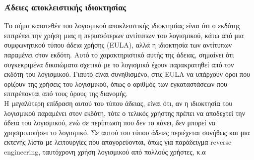 \subsubsection{Άδειες αποκλειστικής ιδιοκτησίας}
Το σήμα κατατεθέν του λογισμικού αποκλειστικής ιδιοκτησίας είναι ότι ο εκδότης επιτρέπει την χρήση μιας η περισσότερων αντίτυπων του λογισμικού, κάτω από μια συμφωνητικού τύπου άδεια χρήσης (EULA), αλλά η ιδιοκτησία των αντίτυπων παραμένει στον εκδότη. Αυτό το χαρακτηριστικό αυτής της άδειας, σημαίνει ότι συγκεκριμένα δικαιώματα σχετικά με το λογισμικό έχουν παρακρατηθεί από τον εκδότη του λογισμικού. Γιαυτό είναι συνηθισμένο, στις EULA να υπάρχουν όροι που ορίζουν της χρήσεις του λογισμικού, όπως ο αριθμός των εγκαταστάσεων που επιτρέπονται από τους όρους της διανομής.\\
Η μεγαλύτερη επίδραση αυτού του τύπου άδειας, είναι ότι, αν η ιδιοκτησία του λογισμικού παραμένει στον εκδότη, τότε ο τελικός χρήστης πρέπει να αποδεχτεί την άδεια του λογισμικού, ενώ σε περίπτωση που δεν το κάνει, δεν μπορεί να χρησιμοποιήσει το λογισμικό. Σε αυτού του τύπου άδειες περιέχεται συνήθως και μια εκτενής λίστα με λειτουργίες που απαγορεύονται, όπως για παράδειγμα reverse engineering, ταυτόχρονη χρήση λογισμικού από πολλούς χρήστες, κ.α
